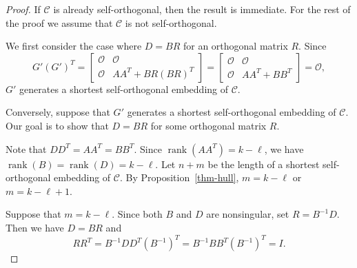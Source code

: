 \documentclass{article}
\theoremstyle{definition}
\theoremstyle{remark}
\begin{document}
\begin{proof}
    If $\mathcal{C}$ is already self-orthogonal, then the result is immediate. For the rest of the proof we assume that $\mathcal{C}$ is not self-orthogonal.
    
    We first consider the case where $D = BR$ for an orthogonal matrix $R$. Since
    \[
    G'(G')^T=\begin{bmatrix}
        \mathcal{O} & \mathcal{O}\\\mathcal{O} & AA^T+BR(BR)^T
    \end{bmatrix}=\begin{bmatrix}
        \mathcal{O} & \mathcal{O}\\\mathcal{O} & AA^T+BB^T
    \end{bmatrix}=\mathcal{O},
    \]
    $G'$ generates a shortest self-orthogonal embedding of $\mathcal{C}$.

    Conversely, suppose that $G'$ generates a shortest self-orthogonal embedding of $\mathcal{C}$. Our goal is to show that $D = BR$ for some orthogonal matrix $R$.

    Note that $DD^T=AA^T=BB^T$. Since $\operatorname{rank}(AA^T)=k-\ell$, we have $\operatorname{rank}(B)=\operatorname{rank}(D)=k-\ell$. Let $n+m$ be the length of a shortest self-orthogonal embedding of $\mathcal{C}$. By Proposition~\ref{thm-hull}, $m=k-\ell$ or $m=k-\ell+1$.

    Suppose that $m=k-\ell$. Since both $B$ and $D$ are nonsingular, set $R=B^{-1}D$. Then we have $D=BR$ and
    \[
    RR^T=B^{-1}DD^T(B^{-1})^T=B^{-1}BB^T(B^{-1})^T=I.
    \]


\end{proof}
\end{document}
